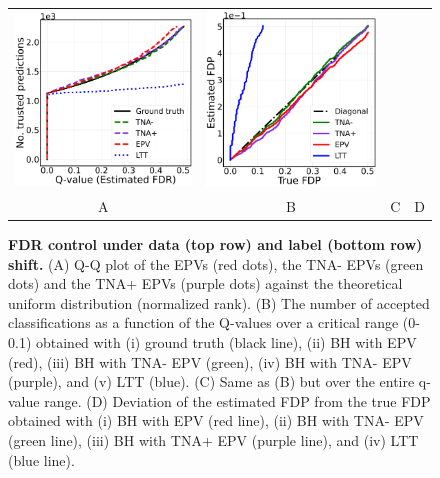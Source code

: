 \documentclass{article}
\begin{document}
\begin{figure}[h!]
\begin{tabular}{cccc}
		\includegraphics[width=0.225\linewidth, height=0.225\linewidth]{img/cnn_balanced_fdr_control.png} & 
		\includegraphics[width=0.225\linewidth, height=0.225\linewidth]{img/cnn_FDPscat_balanced.png} \\		
		A & B & C & D \\
	\end{tabular}
\caption{{\bf  FDR control under data (top row) and label (bottom row) shift.}
	(A) Q-Q plot of the EPVs (red dots), the TNA- EPVs (green dots) and the TNA+ EPVs (purple dots) against the theoretical uniform distribution (normalized rank). (B) The number of accepted classifications as a function of the Q-values over a critical range (0-0.1) obtained with (i) ground truth (black line), (ii) BH with EPV (red), (iii) BH with TNA- EPV (green), (iv) BH with TNA- EPV (purple), and (v) LTT (blue). (C) Same as (B) but over the entire q-value range. (D) Deviation of the estimated FDP from the true FDP obtained with (i) BH with EPV (red line), (ii) BH with TNA- EPV  (green line),  (iii) BH with TNA+ EPV  (purple line), and (iv) LTT (blue line).}
	\label{fig:mnist_shfit}
\end{figure}

	
\end{document}
